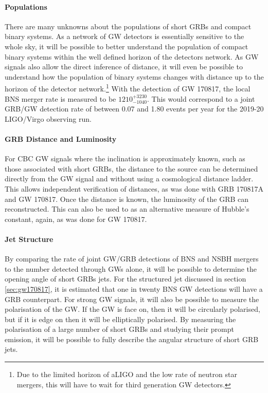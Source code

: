 \documentclass[11pt]{cuthesis}
\begin{document}
\paragraph{Populations}
There are many unknowns about the populations of short GRBs and compact binary systems. As a network of GW detectors is essentially sensitive to the whole sky, it will be possible to better understand the population of compact binary systems within the well defined horizon of the detectors network. As GW signals also allow the direct inference of distance, it will even be possible to understand how the population of binary systems changes with distance up to the horizon of the detector network.\footnote{Due to the limited horizon of aLIGO and the low rate of neutron star mergers, this will have to wait for third generation GW detectors.} With the detection of GW 170817, the local BNS merger rate is measured to be $1210^{+3230}_{-1040}$.\cite{catalog} This would correspond to a joint GRB/GW detection rate of between 0.07 and 1.80 events per year for the 2019-20 LIGO/Virgo observing run.\cite{GW170817_GRB} 

\paragraph{GRB Distance and Luminosity}
For CBC GW signals where the inclination is approximately known, such as those associated with short GRBs, the distance to the source can be determined directly from the GW signal and without using a cosmological distance ladder. This allows independent verification of distances, as was done with GRB 170817A and GW 170817. Once the distance is known, the luminosity of the GRB can reconstructed. This can also be used to as an alternative measure of Hubble's constant, again, as was done for GW 170817.\cite{hubble_constant} 

\paragraph{Jet Structure}
By comparing the rate of joint GW/GRB detections of BNS and NSBH mergers to the number detected through GWs alone, it will be possible to determine the opening angle of short GRBs jets. For the structured jet discussed in section \ref{sec:gw170817}, it is estimated that one in twenty BNS GW detections will have a GRB counterpart\cite{Lazzati_afterglow}. For strong GW signals, it will also be possible to measure the polarisation of the GW. If the GW is face on, then it will be circularly polarised, but if it is edge on then it will be elliptically polarised. By measuring the polarisation of a large number of short GRBs and studying their prompt emission, it will be possible to fully describe the angular structure of short GRB jets. 
\end{document}
